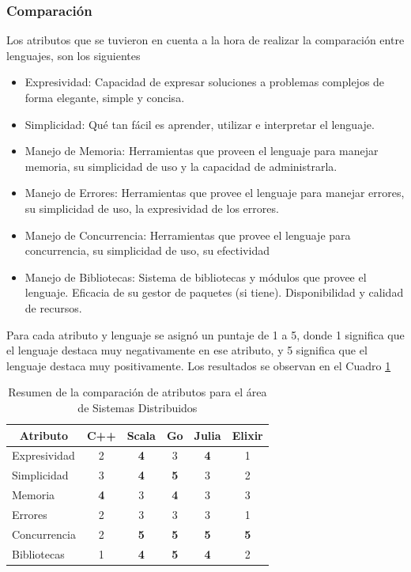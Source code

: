 \documentclass[11pt]{article}
\let\Oldsubsubsection\subsubsection
\renewcommand{\subsubsection}{\FloatBarrier\Oldsubsubsection}
\newcommand{\badMetric}[1]{{\color{BrickRed}#1}}
\newcommand{\goodMetric}[1]{{\textbf{#1}}}
\begin{document}
\subsubsection{Comparación}

Los atributos que se tuvieron en cuenta a la hora de realizar la comparación entre lenguajes, son los siguientes

\begin{itemize}
    \item Expresividad: Capacidad de expresar soluciones a problemas complejos de forma elegante, simple y concisa.
    \item Simplicidad: Qué tan fácil es aprender, utilizar e interpretar el lenguaje.
    \item Manejo de Memoria: Herramientas que proveen el lenguaje para manejar memoria, su simplicidad de uso y la capacidad de administrarla.
    \item Manejo de Errores: Herramientas que provee el lenguaje para manejar errores, su simplicidad de uso, la expresividad de los errores.
    \item Manejo de Concurrencia: Herramientas que provee el lenguaje para concurrencia, su simplicidad de uso, su efectividad
    \item Manejo de Bibliotecas: Sistema de bibliotecas y módulos que provee el lenguaje. Eficacia de su gestor de paquetes (si tiene). Disponibilidad y calidad de recursos.
\end{itemize}

Para cada atributo y lenguaje se asignó un puntaje de 1 a 5, donde 1 significa que el lenguaje destaca muy negativamente en ese atributo, y 5 significa que el lenguaje destaca muy positivamente. Los resultados se observan en el Cuadro \ref{tab:sis_dist:experiences}

\begin{table}[h]
\centering
\begin{tabular}{|l|c|c|c|c|c|}
\hline
\multicolumn{1}{|c|}{Atributo} & C++ & Scala & Go & Julia & Elixir \\ \hline
Expresividad & \badMetric{2} & \goodMetric{4} & 3 & \goodMetric{4} & \badMetric{1} \\ \hline
Simplicidad & 3 & \goodMetric{4} & \goodMetric{5} & 3 & \badMetric{2} \\ \hline
Memoria & \goodMetric{4} & 3 & \goodMetric{4} & 3 & 3 \\ \hline
Errores & \badMetric{2} & 3 & 3 & 3 & \badMetric{1} \\ \hline
Concurrencia & \badMetric{2} & \goodMetric{5} & \goodMetric{5} & \goodMetric{5} & \goodMetric{5} \\ \hline
Bibliotecas & \badMetric{1} & \goodMetric{4} & \goodMetric{5} & \goodMetric{4} & \badMetric{2} \\ \hline
\end{tabular}
\caption{Resumen de la comparación de atributos para el área de Sistemas Distribuidos}
\label{tab:sis_dist:experiences}
\end{table}
\end{document}
